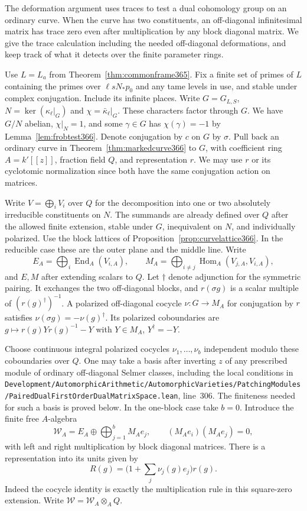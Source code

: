 \documentclass[a4paper,11pt]{article}
\theoremstyle{definition}
\theoremstyle{remark}
\newcommand{\srcloc}[2]{{\small\nolinkurl{#1.lean}}, line~#2}
\numberwithin{equation}{section}
\begin{document}
The deformation argument uses traces to test a dual cohomology
group on an ordinary curve. When the curve has two constituents,
an off-diagonal infinitesimal matrix has trace zero even after
multiplication by any block diagonal matrix. We give the trace
calculation including the needed off-diagonal deformations, and
keep track of what it detects over the finite parameter rings.

Use \(L=L_a\) from Theorem~\ref{thm:commonframe365}. Fix a
finite set of primes of \(L\) containing the primes over
\(\ell sN_*p_0\) and any tame levels in use, and stable under
complex conjugation. Include its infinite places. Write
\(G=G_{L,S}\), \(N=\ker(\kappa_\ell|_G)\) and
\(\chi=\bar\kappa_\ell|_G\). These characters factor through
\(G\). We have \(G/N\) abelian, \(\chi|_N=1\), and some
\(\gamma\in G\) has \(\chi(\gamma)=-1\) by
Lemma~\ref{lem:frobtest366}. Denote conjugation by \(c\) on
\(G\) by \(\sigma\). Pull back an ordinary curve in
Theorem~\ref{thm:markedcurve366} to \(G\), with coefficient
ring \(A=k'[[z]]\), fraction field \(Q\), and representation
\(r\). We may use \(r\) or its cyclotomic normalization since
both have the same conjugation action on matrices.

Write \(V=\bigoplus_i V_i\) over \(Q\) for the decomposition
into one or two absolutely irreducible constituents on \(N\).
The summands are already defined over \(Q\) after the allowed
finite extension, stable under \(G\), inequivalent on \(N\),
and individually polarized. Use the block lattices of
Proposition~\ref{prop:curvelattice366}. In the reducible case
these are the outer plane and the middle line. Write
\[
 E_A=\bigoplus_i\operatorname{End}_A(V_{i,A}),\qquad
 M_A=\bigoplus_{i\ne j}\operatorname{Hom}_A(V_{j,A},V_{i,A}),
\]
and \(E,M\) after extending scalars to \(Q\). Let
\(\dagger\) denote adjunction for the symmetric pairing.
It exchanges the two off-diagonal blocks, and
\(r(\sigma g)\) is a scalar multiple of
\((r(g)^\dagger)^{-1}\). A polarized off-diagonal cocycle
\(\nu:G\to M_A\) for conjugation by \(r\) satisfies
\(\nu(\sigma g)=-\nu(g)^\dagger\). Its polarized
coboundaries are \(g\mapsto r(g)Y r(g)^{-1}-Y\) with
\(Y\in M_A\), \(Y^\dagger=-Y\).

Choose continuous integral polarized cocycles
\(\nu_1,\dots,\nu_b\) independent modulo these coboundaries
over \(Q\). One may take a basis after inverting \(z\) of
any prescribed module of ordinary off-diagonal Selmer classes,
including the local conditions in
\srcloc{Development/AutomorphicArithmetic/AutomorphicVarieties/PatchingModules/PairedDualFirstOrderDualMatrixSpace}{306}.
The finiteness needed for such a basis is proved below.
In the one-block case take \(b=0\). Introduce the finite free
\(A\)-algebra
\[
 \mathcal W_A=E_A\oplus\bigoplus_{j=1}^b M_A e_j,\qquad
 (M_A e_i)(M_A e_j)=0 ,
\]
with left and right multiplication by block diagonal matrices.
There is a representation into its units given by
\[
     R(g)=\Big(1+\sum_j\nu_j(g)e_j\Big)r(g).
\]
Indeed the cocycle identity is exactly the multiplication
rule in this square-zero extension. Write
\(\mathcal W=\mathcal W_A\otimes_A Q\).
\end{document}

